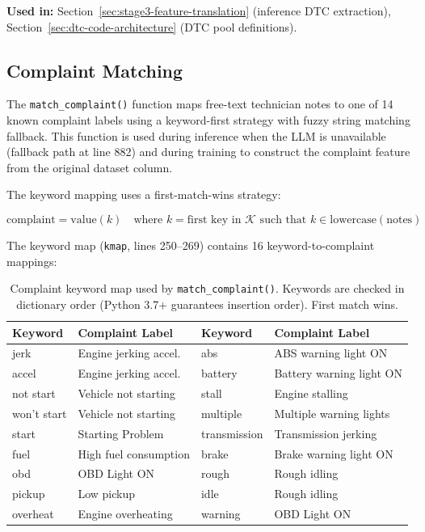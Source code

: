 \documentclass[10pt,a4paper]{article}
\begin{document}
\textbf{Used in:} Section~\ref{sec:stage3-feature-translation} (inference DTC extraction), Section~\ref{sec:dtc-code-architecture} (DTC pool definitions).

\subsection{Complaint Matching}
\label{sec:complaint-matching}

The \texttt{match\_complaint()} function maps free-text technician notes to one of 14 known complaint labels using a keyword-first strategy with fuzzy string matching fallback. This function is used during inference when the LLM is unavailable (fallback path at line 882) and during training to construct the complaint feature from the original dataset column.

The keyword mapping uses a first-match-wins strategy:

\begin{equation}
\text{complaint} = \text{value}(k) \quad \text{where } k = \text{first key in } \mathcal{K} \text{ such that } k \in \text{lowercase}(\text{notes})
\label{eq:keyword-match}
\end{equation}

The keyword map (\texttt{kmap}, lines 250--269) contains 16 keyword-to-complaint mappings:

\begin{table}[H]
\centering
\caption{Complaint keyword map used by \texttt{match\_complaint()}. Keywords are checked in dictionary order (Python 3.7+ guarantees insertion order). First match wins.}
\label{tab:complaint-keywords}
\small
\begin{tabular}{llll}
\toprule
\textbf{Keyword} & \textbf{Complaint Label} & \textbf{Keyword} & \textbf{Complaint Label} \\
\midrule
jerk        & Engine jerking accel.  & abs          & ABS warning light ON \\
accel       & Engine jerking accel.  & battery      & Battery warning light ON \\
not start   & Vehicle not starting   & stall        & Engine stalling \\
won't start & Vehicle not starting   & multiple     & Multiple warning lights \\
start       & Starting Problem       & transmission & Transmission jerking \\
fuel        & High fuel consumption  & brake        & Brake warning light ON \\
obd         & OBD Light ON           & rough        & Rough idling \\
pickup      & Low pickup             & idle         & Rough idling \\
overheat    & Engine overheating     & warning      & OBD Light ON \\
\bottomrule
\end{tabular}
\end{table}
\end{document}
